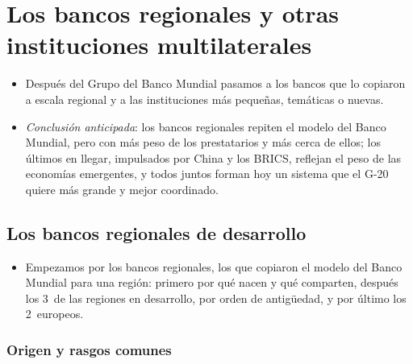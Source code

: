 \documentclass[11pt]{article}
\begin{document}
\section{Los bancos regionales y otras instituciones multilaterales}\label{sec:regionales}

\begin{itemize}
\item Después del Grupo del Banco Mundial pasamos a los bancos que lo copiaron a escala regional y a las instituciones más pequeñas, temáticas o nuevas.
\item \emph{Conclusión anticipada}: los bancos regionales repiten el modelo del Banco Mundial, pero con más peso de los prestatarios y más cerca de ellos; los últimos en llegar, impulsados por China y los BRICS, reflejan el peso de las economías emergentes, y todos juntos forman hoy un sistema que el G-20 quiere más grande y mejor coordinado.
\end{itemize}

\subsection{Los bancos regionales de desarrollo}\label{sec:bancos-regionales}

\begin{itemize}
\item Empezamos por los bancos regionales, los que copiaron el modelo del Banco Mundial para una región: primero por qué nacen y qué comparten, después los 3~de las regiones en desarrollo, por orden de antigüedad, y por último los 2~europeos.
\end{itemize}

\subsubsection{Origen y rasgos comunes}\label{sec:origen-regionales}
\end{document}
